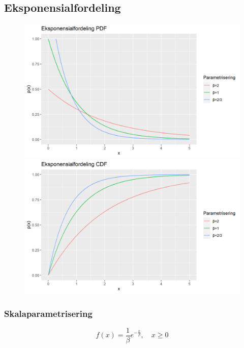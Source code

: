 \subsection{Eksponensialfordeling}\label{eksp}
\begin{figure}[H]
  \centering
  \begin{minipage}[b]{0.49\textwidth}
\includegraphics[width=\textwidth]{bilete/eksppdf.png}
  \end{minipage}
  \hfill
  \begin{minipage}[b]{0.49\textwidth}
    \includegraphics[width=\textwidth]{bilete/ekspcdf.png}
  \end{minipage}
\end{figure}

\subsubsection{Skalaparametrisering}\label{eksp:skala}
\begin{equation}
    f(x) = \frac{1}{\beta} e^{-\frac{x}{\beta}},  \quad  x \geq 0
\end{equation}

